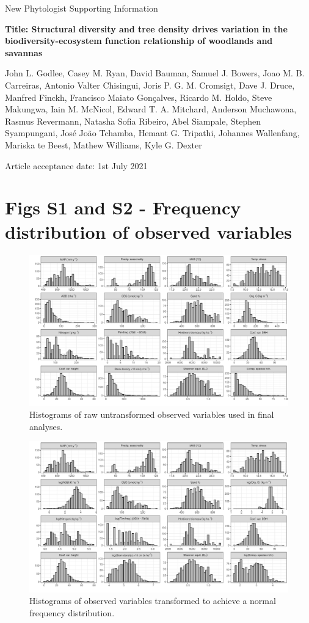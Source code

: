 \documentclass[11pt,a4paper]{article}
\begin{document}
{\Large{New Phytologist Supporting Information}}

{\textbf{Title: Structural diversity and tree density drives variation in the biodiversity-ecosystem function relationship of woodlands and savannas}}

John L. Godlee, Casey M. Ryan, David Bauman, Samuel J. Bowers, Joao M. B. Carreiras, Antonio Valter Chisingui, Joris P. G. M. Cromsigt, Dave J. Druce, Manfred Finckh, Francisco Maiato Gon\c{c}alves, Ricardo M. Holdo, Steve Makungwa, Iain M. McNicol, Edward T. A. Mitchard, Anderson Muchawona, Rasmus Revermann, Natasha Sofia Ribeiro, Abel Siampale, Stephen Syampungani, Jos\'{e} Jo\~{a}o Tchamba, Hemant G. Tripathi, Johannes Wallenfang, Mariska te Beest, Mathew Williams, Kyle G. Dexter

Article acceptance date: 1st July 2021

\section*{Figs S1 and S2 - Frequency distribution of observed variables} \label{appendixa}

\begin{figure}[H]
\centering
	\includegraphics[width=\textwidth]{hist_raw}
	\caption{Histograms of raw untransformed observed variables used in final analyses.}
	\label{hist_raw}
\end{figure}

\begin{figure}[H]
\centering
	\includegraphics[width=\textwidth]{hist_trans}
	\caption{Histograms of observed variables transformed to achieve a normal frequency distribution.}
	\label{hist_trans}
\end{figure}
\end{document}
